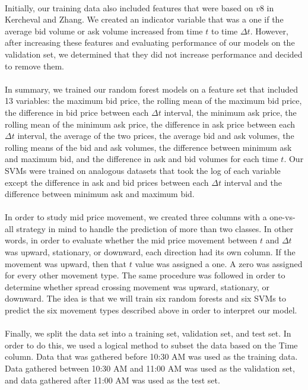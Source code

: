 \documentclass[11pt]{article}
\begin{document}
\\
Initially, our training data also included features that were based on $v8$ in Kercheval and Zhang. We created an indicator variable that was a one if the average bid volume or ask volume increased from time $t$ to time $\Delta t$. However, after increasing these features and evaluating performance of our models on the validation set, we determined that they did not increase performance and decided to remove them.\\
\\
In summary, we trained our random forest models on a feature set that included 13 variables: the maximum bid price, the rolling mean of the maximum bid price, the difference in bid price between each $\Delta t$ interval, the minimum ask price, the rolling mean of the minimum ask price, the difference in ask price between each $\Delta t$ interval, the average of the two prices, the average bid and ask volumes, the rolling means of the bid and ask volumes, the difference between minimum ask and maximum bid, and the difference in ask and bid volumes for each time $t$. Our SVMs were trained on analogous datasets that took the log of each variable except the difference in ask and bid prices between each $\Delta t$ interval and the difference between minimum ask and maximum bid.\\
\\
In order to study mid price movement, we created three columns with a one-vs-all strategy in mind to handle the prediction of more than two classes. In other words, in order to evaluate whether the mid price movement between $t$ and $\Delta t$ was upward, stationary, or downward, each direction had its own column. If the movement was upward, then that $t$ value was assigned a one. A zero was assigned for every other movement type. The same procedure was followed in order to determine whether spread crossing movement was upward, stationary, or downward. The idea is that we will train six random forests and six SVMs to predict the six movement types described above in order to interpret our model.\\
\\
Finally, we split the data set into a training set, validation set, and test set. In order to do this, we used a logical method to subset the data based on the Time column. Data that was gathered before 10:30 AM was used as the training data. Data gathered between 10:30 AM and 11:00 AM was used as the validation set, and data gathered after 11:00 AM was used as the test set. 
\end{document}
